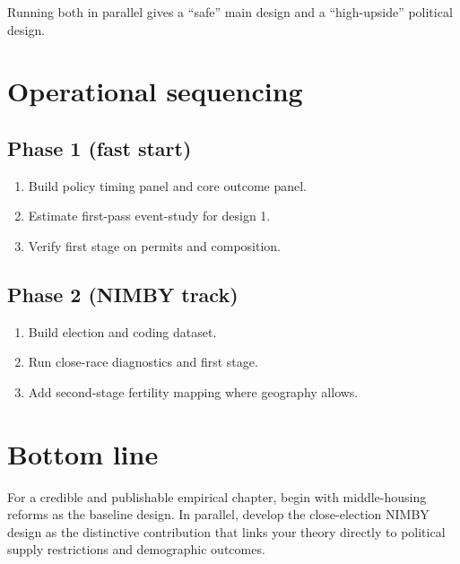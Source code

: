 \documentclass[11pt]{article}
\begin{document}
Running both in parallel gives a ``safe'' main design and a ``high-upside'' political design.

\section{Operational sequencing}
\subsection*{Phase 1 (fast start)}
\begin{enumerate}
\item Build policy timing panel and core outcome panel.
\item Estimate first-pass event-study for design 1.
\item Verify first stage on permits and composition.
\end{enumerate}

\subsection*{Phase 2 (NIMBY track)}
\begin{enumerate}
\item Build election and coding dataset.
\item Run close-race diagnostics and first stage.
\item Add second-stage fertility mapping where geography allows.
\end{enumerate}

\section*{Bottom line}
For a credible and publishable empirical chapter, begin with middle-housing reforms as the baseline design. In parallel, develop the close-election NIMBY design as the distinctive contribution that links your theory directly to political supply restrictions and demographic outcomes.
\end{document}
